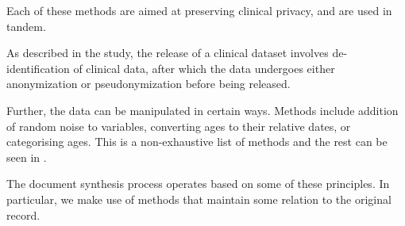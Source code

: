 Each of these methods are aimed at preserving clinical privacy, and are used in tandem.

As described in the study, the release of a clinical dataset involves de-identification of clinical data, after which the data undergoes either anonymization or pseudonymization before being released.

Further, the data can be manipulated in certain ways. Methods include addition of random noise to variables, converting ages to their relative dates, or categorising ages. This is a non-exhaustive list of methods and the rest can be seen in \autocite{Rodriguez_Tuck_Dozier_Lewis_Eldridge_Jackson_Murray_Weir_2022}.

The document synthesis process operates based on some of these principles. In particular, we make use of methods that maintain some relation to the original record.
